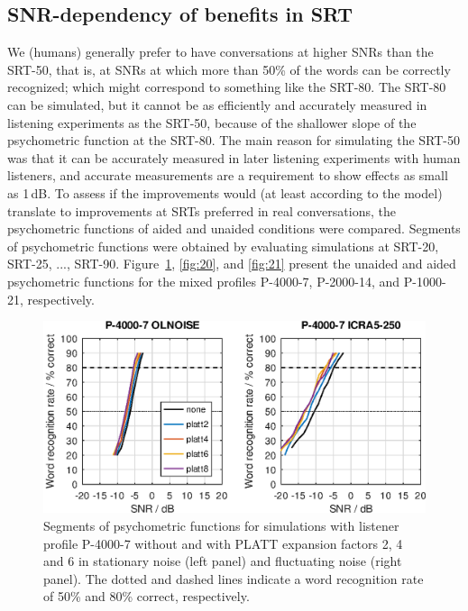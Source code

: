 \documentclass[10pt,a4paper,twocolumn]{article}
\begin{document}
\subsection*{SNR-dependency of benefits in SRT}
%
We (humans) generally prefer to have conversations at higher SNRs than the SRT-50, that is, at SNRs at which more than 50\% of the words can be correctly recognized; which might correspond to something like the SRT-80.
%
The SRT-80 can be simulated, but it cannot be as efficiently and accurately measured in listening experiments as the SRT-50, because of the shallower slope of the psychometric function at the SRT-80.
%
The main reason for simulating the SRT-50 was that it can be accurately measured in later listening experiments with human listeners, and accurate measurements are a requirement to show effects as small as 1\,dB.
%
To assess if the improvements would (at least according to the model) translate to improvements at SRTs preferred in real conversations, the psychometric functions of aided and unaided conditions were compared.
%
Segments of psychometric functions were obtained by evaluating simulations at SRT-20, SRT-25, ..., SRT-90.
%
Figure~\ref{fig:19}, \ref{fig:20}, and \ref{fig:21} present the unaided and aided psychometric functions for the mixed profiles P-4000-7, P-2000-14, and P-1000-21, respectively.
%
\begin{figure}
	\centerline{\includegraphics[width=\columnwidth]{images/psyfun-P-4000-7}}
	\caption{Segments of psychometric functions for simulations with listener profile P-4000-7 without and with PLATT expansion factors 2, 4 and 6 in stationary noise (left panel) and fluctuating noise (right panel).
	The dotted and dashed lines indicate a word recognition rate of 50\% and 80\% correct, respectively.}
	\label{fig:19}
\end{figure}
%
\end{document}

